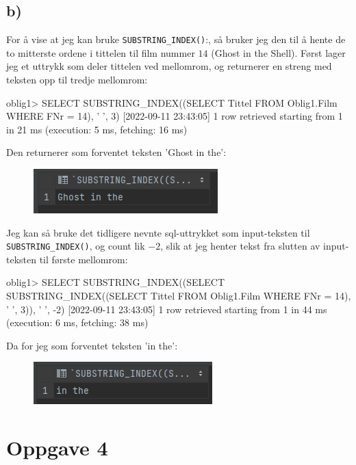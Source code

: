 \documentclass[%
notitlepage,
 amsmath,amssymb,
 aps,
rmp,
]{revtex4-2}  %
\begin{document}
\subsection*{b)}
For å vise at jeg kan bruke \verb+SUBSTRING_INDEX()+:, så bruker jeg den til å hente de to mitterste ordene i tittelen til film nummer \(14\) (Ghost in the Shell). Først lager jeg et uttrykk som deler tittelen ved mellomrom, og returnerer en streng med teksten opp til tredje mellomrom:
\begin{sql}
oblig1> SELECT SUBSTRING_INDEX((SELECT Tittel FROM Oblig1.Film WHERE FNr = 14), ' ', 3)
[2022-09-11 23:43:05] 1 row retrieved starting from 1 in 21 ms (execution: 5 ms, fetching: 16 ms)
\end{sql}
Den returnerer som forventet teksten 'Ghost in the':
\begin{figure}[H]
\centering\includegraphics[scale=1]{op3b1.png}
\end{figure}

Jeg kan så bruke det tidligere nevnte sql-uttrykket som input-teksten til \verb+SUBSTRING_INDEX()+, og count lik \(-2\), slik at jeg henter tekst fra slutten av input-teksten til første mellomrom:
\begin{sql}
oblig1> SELECT SUBSTRING_INDEX((SELECT SUBSTRING_INDEX((SELECT Tittel FROM Oblig1.Film WHERE FNr = 14), ' ', 3)), ' ', -2)
[2022-09-11 23:43:05] 1 row retrieved starting from 1 in 44 ms (execution: 6 ms, fetching: 38 ms)
\end{sql}
Da for jeg som forventet teksten 'in the':
\begin{figure}[H]
\centering\includegraphics[scale=1]{op3b2.png}
\end{figure}

\section*{Oppgave 4}
\end{document}

